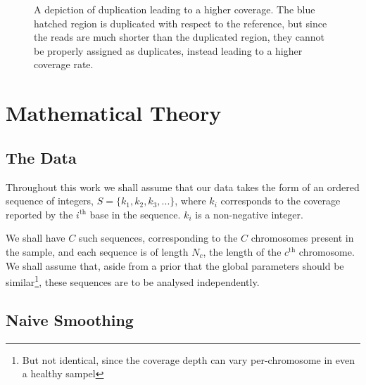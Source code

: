 \documentclass[fleqn,usenatbib]{mnras}
\begin{document}
\begin{figure}
\begin{center}
			\end{center}\caption{A depiction of duplication leading to a higher coverage. The blue hatched region is duplicated with respect to the reference, but since the reads are much shorter than the duplicated region, they cannot be properly assigned as duplicates, instead leading to a higher coverage rate.}\label{Fig:Diagram}
		\end{figure}

	\section{Mathematical Theory}

		\subsection*{The Data}

			Throughout this work we shall assume that our data takes the form of an ordered sequence of integers, $S = \{k_1,k_2,k_3,...\}$, where $k_i$ corresponds to the coverage reported by the $i^\text{th}$ base in the sequence. $k_i$ is a non-negative integer.
			
			We shall have $C$ such sequences, corresponding to the $C$ chromosomes present in the sample, and each sequence is of length $N_c$, the length of the $c^\text{th}$ chromosome. We shall assume that, aside from a prior that the global parameters should be similar\footnote{But not identical, since the coverage depth can vary per-chromosome in even a healthy sampel}, these sequences are to be analysed independently.

		\subsection{Naive Smoothing}
\end{document}
